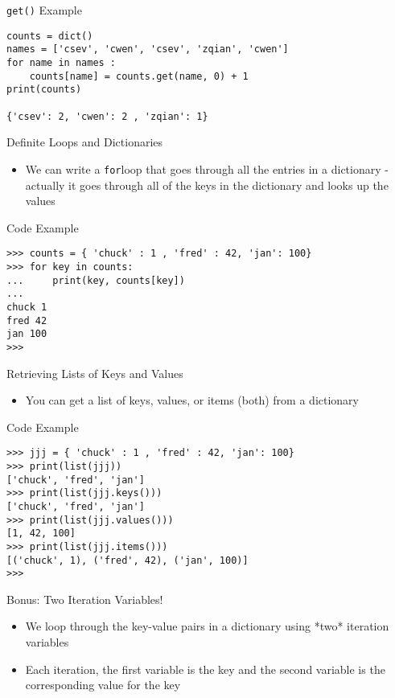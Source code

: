 \documentclass[serif, aspectratio=169]{beamer}
\begin{document}
\begin{frame}[fragile]{\texttt{\color{red}get()} Example}
    \begin{lstlisting}
counts = dict()
names = ['csev', 'cwen', 'csev', 'zqian', 'cwen']
for name in names :
    counts[name] = counts.get(name, 0) + 1
print(counts)

{'csev': 2, 'cwen': 2 , 'zqian': 1}
    \end{lstlisting}
\end{frame}

\begin{frame}{Definite Loops and Dictionaries}
    \begin{itemize}
        \item We can write a \texttt{\color{red}for}loop that goes through all the entries in a dictionary - actually it goes through all of the keys in the dictionary and looks up the values
    \end{itemize}
\end{frame}

\begin{frame}[fragile]{Code Example}
    \begin{lstlisting}
>>> counts = { 'chuck' : 1 , 'fred' : 42, 'jan': 100}
>>> for key in counts:
...     print(key, counts[key])
... 
chuck 1
fred 42
jan 100
>>> 
    \end{lstlisting}
\end{frame}

\begin{frame}{Retrieving Lists of Keys and Values}
    \begin{itemize}
        \item You can get a list of keys, values, or items (both) from a dictionary
    \end{itemize}
\end{frame}

\begin{frame}[fragile]{Code Example}
    \begin{lstlisting}
>>> jjj = { 'chuck' : 1 , 'fred' : 42, 'jan': 100}
>>> print(list(jjj))
['chuck', 'fred', 'jan']
>>> print(list(jjj.keys()))
['chuck', 'fred', 'jan']
>>> print(list(jjj.values()))
[1, 42, 100]
>>> print(list(jjj.items()))
[('chuck', 1), ('fred', 42), ('jan', 100)]
>>> 
    \end{lstlisting}
\end{frame}

\begin{frame}{Bonus: Two Iteration Variables!}
    \begin{itemize}
        \item We loop through the key-value pairs in a dictionary using *two* iteration variables
        \item Each iteration, the first variable is the key and the second variable is the corresponding value for the key

    \end{itemize}
\end{frame}
\end{document}
